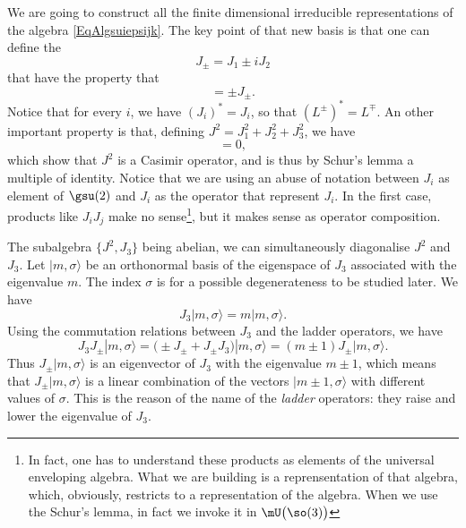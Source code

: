 We are going to construct all the finite dimensional irreducible representations of the algebra \eqref{EqAlgsuiepsijk}. The key point of that new basis is that one can define the 
\begin{equation}
    J_{\pm}=J_1\pm iJ_2
\end{equation}
that have the property that
\begin{equation}
    [J_3,J_{\pm}]=\pm J_{\pm}.
\end{equation}
Notice that for every $i$, we have $(J_i)^*=J_i$, so that $(L^{\pm})^*=L^{\mp}$. An other important property is that, defining $J^2=J_1^2+J_2^2+J_3^2$, we have
\begin{equation}
    [J_i,J^2]=0,
\end{equation}
which show that $J^2$ is a Casimir operator, and is thus by Schur's lemma a multiple of identity. Notice that we are using an abuse of notation between $J_i$ as element of $\gsu(2)$ and $J_i$ as the operator that represent $J_i$. In the first case, products like $J_iJ_j$ make no sense\footnote{In fact, one has to understand these products as elements of the universal enveloping algebra. What we are building is a reprensentation of that algebra, which, obviously, restricts to a representation of the algebra. When we use the Schur's lemma, in fact we invoke it in $\mU\big(\so(3)\big)$}, but it makes sense as operator composition.

The subalgebra $\{ J^2,J_3 \}$ being abelian, we can simultaneously diagonalise $J^2$ and $J_3$. Let $| m,\sigma \rangle $ be an orthonormal basis of the eigenspace of $J_3$ associated with the eigenvalue $m$. The index $\sigma$ is for a possible degenerateness to be studied later.  We have
\[
    J_3| m,\sigma \rangle =m| m,\sigma \rangle .
\]
Using the commutation relations between $J_3$ and the ladder operators, we have
\begin{equation}        \label{EqJtroisJpmmplusun}
    J_3J_{\pm}| m,\sigma \rangle =\big( \pm J_{\pm}+J_{\pm}J_3 \big)| m,\sigma \rangle =(m\pm 1)J_{\pm}| m,\sigma \rangle .
\end{equation}
Thus $J_{\pm}| m,\sigma \rangle $ is an eigenvector of $J_3$ with the eigenvalue $m\pm 1$, which means that $J_{\pm}| m,\sigma \rangle $ is a linear combination of the vectors $| m\pm 1,\sigma \rangle $ with different values of $\sigma$. This is the reason of the name of the \emph{ladder} operators: they raise and lower the eigenvalue of $J_3$.

